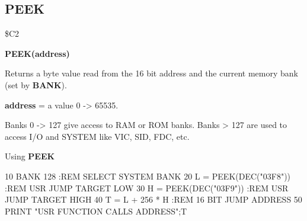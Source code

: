 \subsection{PEEK}
\begin{description}[leftmargin=3cm,style=nextline]
\item [Token:] \$C2
\item [Format:] {\bf PEEK(address)}
\item [Usage:]  Returns a byte value
                read from the 16 bit address and the current
                memory bank (set by {\bf BANK}).

                {\bf address} = a value 0 -> 65535.

\item [Remarks:] Banks 0 -> 127 give access to RAM or ROM banks.
                 Banks > 127 are used to access I/O and SYSTEM
                 like VIC, SID, FDC, etc.
\item [Example:] Using {\bf PEEK}

\begin{screenoutput}
 10 BANK 128                :REM SELECT SYSTEM BANK
 20 L = PEEK(DEC("03F8"))   :REM USR JUMP TARGET LOW
 30 H = PEEK(DEC("03F9"))   :REM USR JUMP TARGET HIGH
 40 T = L + 256 * H         :REM 16 BIT JUMP ADDRESS
 50 PRINT "USR FUNCTION CALLS ADDRESS";T
\end{screenoutput}
\end{description}


\newpage
